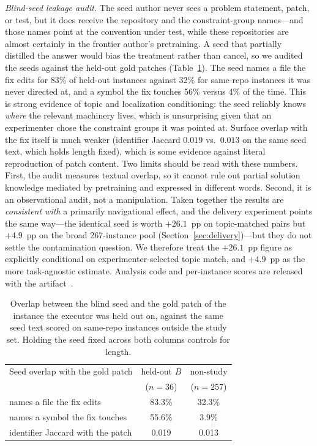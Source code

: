 \documentclass[sigconf,screen]{acmart}
\begin{document}
\emph{Blind-seed leakage audit.} The seed author never sees a problem statement,
patch, or test, but it does receive the repository and the constraint-group
names---and those names point at the convention under test, while these
repositories are almost certainly in the frontier author's pretraining. A seed that
partially distilled the answer would bias the treatment rather than cancel, so we
audited the seeds against the held-out gold patches (Table~\ref{tab:leakage}). The
seed names a file the fix edits for 83\% of held-out instances against 32\% for
same-repo instances it was never directed at, and a symbol the fix touches 56\%
versus 4\% of the time. This is strong evidence of topic and localization
conditioning: the seed reliably knows \emph{where} the relevant machinery lives,
which is unsurprising given that an experimenter chose the constraint groups it was
pointed at. Surface overlap with the fix itself is much weaker (identifier Jaccard
$0.019$ vs.\ $0.013$ on the same seed text, which holds length fixed), which is
some evidence against literal reproduction of patch content. Two limits should be
read with these numbers. First, the audit measures textual overlap, so it cannot
rule out partial solution knowledge mediated by pretraining and expressed in
different words. Second, it is an observational audit, not a manipulation. Taken
together the results are \emph{consistent with} a primarily navigational effect,
and the delivery experiment points the same way---the identical seed is worth
$+26.1$~pp on topic-matched pairs but $+4.9$~pp on the broad 267-instance pool
(Section~\ref{sec:delivery})---but they do not settle the contamination question.
We therefore treat the $+26.1$~pp figure as explicitly conditional on
experimenter-selected topic match, and $+4.9$~pp as the more task-agnostic
estimate. Analysis code and per-instance scores are released with the
artifact~\cite{artifact}.

\begin{table}[t]
\caption{Overlap between the blind seed and the gold patch of the instance the
executor was held out on, against the same seed text scored on same-repo instances
outside the study set. Holding the seed fixed across both columns controls for
length.}
\label{tab:leakage}
\small
\begin{tabular}{@{}lcc@{}}
\toprule
Seed overlap with the gold patch & held-out $B$ & non-study \\
 & ($n=36$) & ($n=257$) \\
\midrule
names a file the fix edits & 83.3\% & 32.3\% \\
names a symbol the fix touches & 55.6\% & 3.9\% \\
identifier Jaccard with the patch & 0.019 & 0.013 \\
\bottomrule
\end{tabular}
\end{table}
\end{document}
